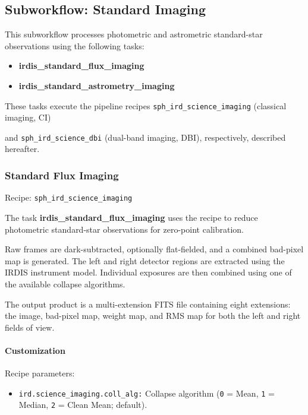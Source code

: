 \subsection{Subworkflow: Standard Imaging}

This subworkflow processes photometric and astrometric standard-star
observations using the following tasks:

\begin{itemize}
    \item \textbf{irdis\_standard\_flux\_imaging}
    \item \textbf{irdis\_standard\_astrometry\_imaging}
\end{itemize}

These tasks execute the pipeline recipes
\texttt{sph\_ird\_science\_imaging} (classical imaging, CI) 

and
\texttt{sph\_ird\_science\_dbi} (dual-band imaging, DBI), respectively, described hereafter.

\subsubsection{Standard Flux Imaging}

Recipe: \texttt{sph\_ird\_science\_imaging}

The task \textbf{irdis\_standard\_flux\_imaging} uses the recipe to reduce photometric standard-star observations for zero-point calibration.

Raw frames are dark-subtracted, optionally flat-fielded, and a combined bad-pixel map is generated. The left and right detector regions are
extracted using the IRDIS instrument model. Individual exposures are then
combined using one of the available collapse algorithms.

The output product is a multi-extension FITS file containing eight extensions:
the image, bad-pixel map, weight map, and RMS map for both the left and
right fields of view.

\paragraph{Customization}

Recipe parameters:

\begin{itemize}

\item \texttt{ird.science\_imaging.coll\_alg:} 
Collapse algorithm
(\texttt{0} = Mean,
 \texttt{1} = Median,
 \texttt{2} = Clean Mean; default).

\end{itemize}

